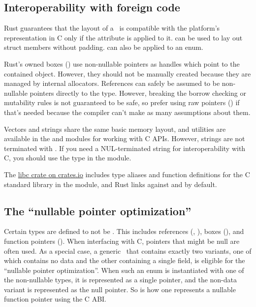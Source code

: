 \subsection*{Interoperability with foreign code}

Rust guarantees that the layout of a \struct\ is compatible with the platform's representation in C only if the 
\code{\#[repr(C)]} attribute is applied to it.  can be used to lay out struct members 
without padding. \code{\#[repr(C)]} can also be applied to an enum.

\blank

Rust's owned boxes () use non-nullable pointers as handles which point to the contained object. However, 
they should not be manually created because they are managed by internal allocators. References can safely be assumed 
to be non-nullable pointers directly to the type. However, breaking the borrow checking or mutability rules is not 
guaranteed to be safe, so prefer using raw pointers (\code{*}) if that's needed because the compiler can't make as many 
assumptions about them.

\blank

Vectors and strings share the same basic memory layout, and utilities are available in the  and  
modules for working with C APIs. However, strings are not terminated with . If you need a NUL-terminated string 
for interoperability with C, you should use the  type in the  module.

\blank

The \href{https://crates.io/crates/libc}{libc crate on crates.io} includes type aliases and function definitions for 
the C standard library in the  module, and Rust links against  and  by default.

\subsection*{The \enquote{nullable pointer optimization}}

Certain types are defined to not be . This includes references (, ), boxes (), 
and function pointers (). When interfacing with C, pointers that might be null are often used. 
As a special case, a generic \enum\ that contains exactly two variants, one of which contains no data and the other containing 
a single field, is eligible for the \enquote{nullable pointer optimization}. When such an enum is instantiated with one of 
the non-nullable types, it is represented as a single pointer, and the non-data variant is represented as the null pointer. 
So  is how one represents a nullable function pointer using the C ABI.

